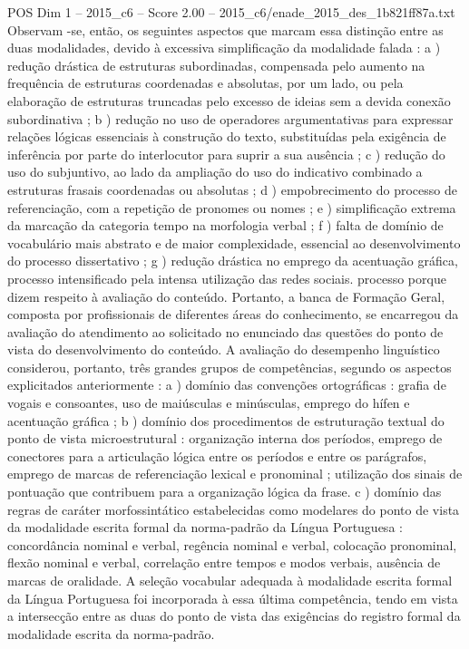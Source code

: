 \begin{textsample}{POS Dim 1 – 2015\_c6 – Score 2.00 – 2015\_c6/enade\_2015\_des\_1b821ff87a.txt}
Observam -se, então, os seguintes aspectos que marcam essa distinção entre as duas modalidades, devido à excessiva simplificação da modalidade falada : a ) redução drástica de estruturas subordinadas, compensada pelo aumento na frequência de estruturas coordenadas e absolutas, por um lado, ou pela elaboração de estruturas truncadas pelo excesso de ideias sem a devida conexão subordinativa ; b ) redução no uso de operadores argumentativas para expressar relações lógicas essenciais à construção do texto, substituídas pela exigência de inferência por parte do interlocutor para suprir a sua ausência ; c ) redução do uso do subjuntivo, ao lado da ampliação do uso do indicativo combinado a estruturas frasais coordenadas ou absolutas ; d ) empobrecimento do processo de referenciação, com a repetição de pronomes ou nomes ; e ) simplificação extrema da marcação da categoria tempo na morfologia verbal ; f ) falta de domínio de vocabulário mais abstrato e de maior complexidade, essencial ao desenvolvimento do processo dissertativo ; g ) redução drástica no emprego da acentuação gráfica, processo intensificado pela intensa utilização das redes sociais. processo porque dizem respeito à avaliação do conteúdo.
Portanto, a banca de Formação Geral, composta por profissionais de diferentes áreas do conhecimento, se encarregou da avaliação do atendimento ao solicitado no enunciado das questões do ponto de vista do desenvolvimento do conteúdo.
A avaliação do desempenho linguístico considerou, portanto, três grandes grupos de competências, segundo os aspectos explicitados anteriormente : a ) domínio das convenções ortográficas : grafia de vogais e consoantes, uso de maiúsculas e minúsculas, emprego do hífen e acentuação gráfica ; b ) domínio dos procedimentos de estruturação textual do ponto de vista microestrutural : organização interna dos períodos, emprego de conectores para a articulação lógica entre os períodos e entre os parágrafos, emprego de marcas de referenciação lexical e pronominal ; utilização dos sinais de pontuação que contribuem para a organização lógica da frase. c ) domínio das regras de caráter morfossintático estabelecidas como modelares do ponto de vista da modalidade escrita formal da norma-padrão da Língua Portuguesa : concordância nominal e verbal, regência nominal e verbal, colocação pronominal, flexão nominal e verbal, correlação entre tempos e modos verbais, ausência de marcas de oralidade.
A seleção vocabular adequada à modalidade escrita formal da Língua Portuguesa foi incorporada à essa última competência, tendo em vista a intersecção entre as duas do ponto de vista das exigências do registro formal da modalidade escrita da norma-padrão.

\end{textsample}

